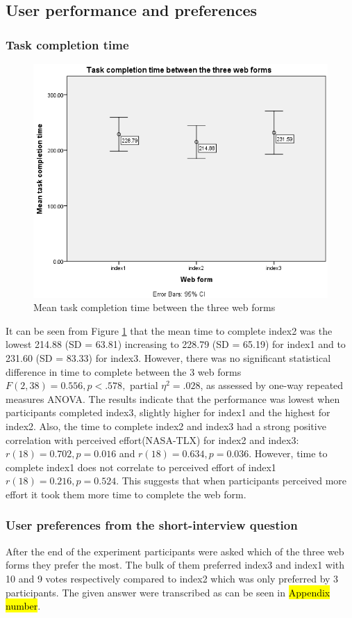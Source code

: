 \documentclass[a4paper]{report}
\begin{document}
		\subsection{User performance and preferences}
			\subsubsection{Task completion time}		
			\begin{figure}[h]
				\centering
				\includegraphics[width=0.7\linewidth]{mean-task-completion-time}
				\caption[Task completion time between the three web forms]{Mean task completion time between the three web forms}
				\label{fig:mean-task-completion-time}
			\end{figure}
			It can be seen from Figure \ref{fig:mean-task-completion-time} that the mean time to complete index2 was the lowest 214.88 (SD = 63.81) increasing to 228.79 (SD = 65.19) for index1 and to 231.60 (SD = 83.33) for index3. However, there was no significant statistical difference in time to complete between the 3 web forms $F(2,38)=0.556, p<.578,$ partial $\eta^{2}=.028$, as assessed by one-way repeated measures ANOVA. The results indicate that the performance was lowest when participants completed index3, slightly higher for index1 and the highest for index2.
			Also, the time to complete index2 and index3 had a strong positive correlation with perceived effort(NASA-TLX) for index2 and index3: $r(18)=0.702, p=0.016$ and $r(18)=0.634, p=0.036$. However, time to complete index1 does not correlate to perceived effort of index1 $r(18)=0.216, p=0.524$. This suggests that when participants perceived more effort it took them more time to complete the web form.
			\subsubsection{User preferences from the short-interview question}
			After the end of the experiment participants were asked which of the three web forms they prefer the most. The bulk of them preferred index3 and index1 with 10 and 9 votes respectively compared to index2 which was only preferred by 3 participants. The given answer were transcribed as can be seen in \hl{Appendix number}. 
\end{document}
